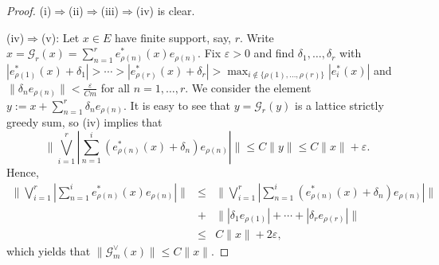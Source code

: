 \documentclass[12pt,leqno]{amsart}
\numberwithin{equation}{section}
\theoremstyle{definition}
\begin{document}
\begin{proof}
(i)$\Rightarrow$(ii)$\Rightarrow$(iii)$\Rightarrow$(iv) is clear. 
\medskip

(iv)$\Rightarrow$(v): Let $x\in E$ have finite support, say, $r$. Write $x=\mathcal{G}_r(x)=\sum_{n=1}^r e_{\rho(n)}^*(x)e_{\rho(n)}$. Fix $\varepsilon>0$ and find $\delta_1, \dots, \delta_r$ with $|e_{\rho(1)}^*(x)+\delta_1|>\cdots >|e_{\rho(r)}^*(x)+\delta_r|>\max_{i\not\in \{\rho(1),\dots,\rho(r)\}}|e_i^*(x)|$ and $\|\delta_n e_{\rho(n)}\|<\frac{\varepsilon}{Cm}$ for all $n=1,\dots,r$. We  consider the element $y:=x+\sum_{n=1}^r \delta_n e_{\rho(n)}$. It is easy to see that $y=\mathcal{G}_r(y)$ is a lattice strictly greedy sum,  so  (iv) implies that
$$\bigg\|\bigvee_{i=1}^r \left|\sum_{n=1}^i (e_{\rho(n)}^*(x)+\delta_n)e_{\rho(n)} \right|\bigg\|\leq C\|y\|\leq C\|x\|+\varepsilon.$$
Hence,
\begin{eqnarray*}
\bigg\|\bigvee_{i=1}^r \left|\sum_{n=1}^i e_{\rho(n)}^*(x)e_{\rho(n)} \right|\bigg\|&\leq& \bigg\|\bigvee_{i=1}^r \left|\sum_{n=1}^i (e_{\rho(n)}^*(x)+\delta_n)e_{\rho(n)} \right|\bigg\|\\
&+&\bigg\||\delta_1e_{\rho(1)}|+\cdots +|\delta_re_{\rho(r)}|\bigg\|\\
&\leq& C\|x\|+2\varepsilon,
\end{eqnarray*}
which yields that $\|\mathcal{G}_m^\vee(x)\|\leq C\|x\|$.
\medskip








\end{proof}
\end{document}
